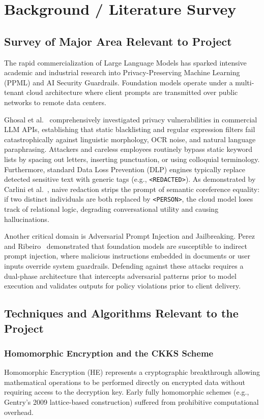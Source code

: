 \chapter{Background / Literature Survey}

\section{Survey of Major Area Relevant to Project}
The rapid commercialization of Large Language Models has sparked intensive academic and industrial research into Privacy-Preserving Machine Learning (PPML) and AI Security Guardrails. Foundation models operate under a multi-tenant cloud architecture where client prompts are transmitted over public networks to remote data centers. 

Ghosal et al.~\cite{ghosal2023llm} comprehensively investigated privacy vulnerabilities in commercial LLM APIs, establishing that static blacklisting and regular expression filters fail catastrophically against linguistic morphology, OCR noise, and natural language paraphrasing. Attackers and careless employees routinely bypass static keyword lists by spacing out letters, inserting punctuation, or using colloquial terminology. Furthermore, standard Data Loss Prevention (DLP) engines typically replace detected sensitive text with generic tags (e.g., \texttt{<REDACTED>}). As demonstrated by Carlini et al.~\cite{carlini2021extracting}, naive redaction strips the prompt of semantic coreference equality: if two distinct individuals are both replaced by \texttt{<PERSON>}, the cloud model loses track of relational logic, degrading conversational utility and causing hallucinations.

Another critical domain is Adversarial Prompt Injection and Jailbreaking. Perez and Ribeiro~\cite{perez2022ignore} demonstrated that foundation models are susceptible to indirect prompt injection, where malicious instructions embedded in documents or user inputs override system guardrails. Defending against these attacks requires a dual-phase architecture that intercepts adversarial patterns prior to model execution and validates outputs for policy violations prior to client delivery.

\section{Techniques and Algorithms Relevant to the Project}

\subsection{Homomorphic Encryption and the CKKS Scheme}
Homomorphic Encryption (HE) represents a cryptographic breakthrough allowing mathematical operations to be performed directly on encrypted data without requiring access to the decryption key. Early fully homomorphic schemes (e.g., Gentry's 2009 lattice-based construction) suffered from prohibitive computational overhead. 


